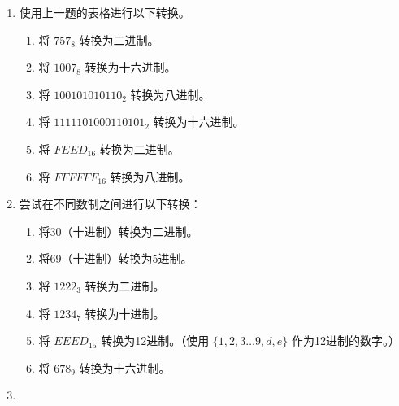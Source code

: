 \begin{enumerate}
{ 
  
  这只是用二进制计数。记住一个健全性检查，即十六进制数字A在二进制中表示为1010。（$10_{10} \; = \; A_{16} \; = \; 1010_{2}$）
  
  \vfill
  
  }
  
  \hintspagebreak
  \workbookpagebreak
  \textbookpagebreak
  
  \item 
  使用上一题的表格进行以下转换。
  \begin{enumerate}
  \item 将 $757_8$ 转换为二进制。
  \item 将 $1007_8$ 转换为十六进制。
  \item 将 $100101010110_2$ 转换为八进制。
  \item 将 $1111101000110101_2$ 转换为十六进制。
  \item 将 $FEED_{16}$ 转换为二进制。
  \item 将 $FFFFFF_{16}$ 转换为八进制。
  \end{enumerate}
  
  
  \wbvfill
  
  \item 
  
  尝试在不同数制之间进行以下转换：
  
  \begin{enumerate}
  \item 将30（十进制）转换为二进制。
  \item 将69（十进制）转换为5进制。
  \item 将 $1222_3$ 转换为二进制。
  \item 将 $1234_7$ 转换为十进制。
  \item  将 $EEED_{15}$ 转换为12进制。（使用 $\{1, 2, 3 \ldots 9, d, e\}$ 作为12进制的数字。）
  \item 将 $678_{9}$ 转换为十六进制。
  \end{enumerate}
  
  
  \wbvfill
  
  \hintspagebreak
  \workbookpagebreak
  
  \item 
    

\end{enumerate}
